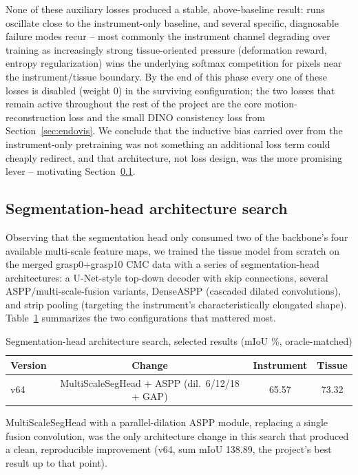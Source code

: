 \documentclass[conference]{IEEEtran}
\begin{document}
None of these auxiliary losses produced a stable, above-baseline result:
runs oscillate close to the instrument-only baseline, and several
specific, diagnosable failure modes recur -- most commonly the instrument
channel degrading over training as increasingly strong tissue-oriented
pressure (deformation reward, entropy regularization) wins the underlying
softmax competition for pixels near the instrument/tissue boundary. By
the end of this phase every one of these losses is disabled (weight 0)
in the surviving configuration; the two losses that remain active
throughout the rest of the project are the core motion-reconstruction
loss and the small DINO consistency loss from Section~\ref{sec:endovis}.
We conclude that the inductive bias carried over from the instrument-only
pretraining was not something an additional loss term could cheaply
redirect, and that architecture, not loss design, was the more promising
lever -- motivating Section~\ref{sec:archsearch}.

\subsection{Segmentation-head architecture search}
\label{sec:archsearch}

Observing that the segmentation head only consumed two of the backbone's
four available multi-scale feature maps, we trained the tissue model from
scratch on the merged grasp0+grasp10 CMC data with a series of
segmentation-head architectures: a U-Net-style top-down decoder with skip
connections, several ASPP/multi-scale-fusion variants, DenseASPP
(cascaded dilated convolutions), and strip pooling (targeting the
instrument's characteristically elongated shape). Table~\ref{tab:arch}
summarizes the two configurations that mattered most.

\begin{table}[htbp]
\caption{Segmentation-head architecture search, selected results (mIoU \%, oracle-matched)}
\label{tab:arch}
\centering
\begin{tabular}{lccc}
\toprule
Version & Change & Instrument & Tissue \\
\midrule
v64 & MultiScaleSegHead + ASPP (dil.\ 6/12/18 + GAP) & 65.57 & 73.32 \\
\bottomrule
\end{tabular}
\end{table}

MultiScaleSegHead with a parallel-dilation ASPP module, replacing a
single fusion convolution, was the only architecture change in this
search that produced a clean, reproducible improvement (v64, sum
mIoU 138.89, the project's best result up to that point).
\end{document}
